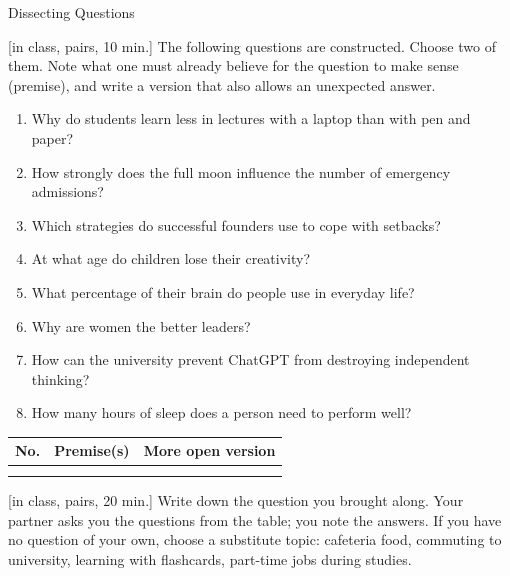 \begin{uebungsblatt}{Dissecting Questions}

[in class, pairs, 10 min.]
The following questions are constructed. Choose two of them. Note what one
must already believe for the question to make sense (premise), and write a
version that also allows an unexpected answer.

\begin{enumerate}
  \item Why do students learn less in lectures with a laptop than with pen
    and paper?
  \item How strongly does the full moon influence the number of emergency
    admissions?
  \item Which strategies do successful founders use to cope with setbacks?
  \item At what age do children lose their creativity?
  \item What percentage of their brain do people use in everyday life?
  \item Why are women the better leaders?
  \item How can the university prevent ChatGPT from destroying independent
    thinking?
  \item How many hours of sleep does a person need to perform well?
\end{enumerate}

\begin{center}
\renewcommand{\arraystretch}{2.2}
\begin{tabular}{|p{}|p{}|p{}|}
\hline
\textbf{No.} & \textbf{Premise(s)} & \textbf{More open version} \\
\hline
 & & \\ \hline
 & & \\ \hline
\end{tabular}
\end{center}

[in class, pairs, 20 min.]
Write down the question you brought along. Your partner asks you the
questions from the table; you note the answers. If you have no question of
your own, choose a substitute topic: cafeteria food, commuting to
university, learning with flashcards, part-time jobs during studies.


\end{uebungsblatt}
